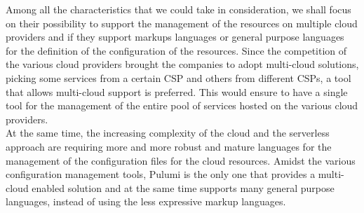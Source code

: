 Among all the characteristics that we could take in consideration, we shall focus on their possibility to support the management of the resources on multiple cloud providers and if they support markups languages or general purpose languages for the definition of the configuration of the resources.
Since the competition of the various cloud providers brought the companies to adopt multi-cloud solutions, picking some services from a certain CSP and others from different CSPs, a tool that allows multi-cloud support is preferred.
This would ensure to have a single tool for the management of the entire pool of services hosted on the various cloud providers.\\
At the same time, the increasing complexity of the cloud and the serverless approach are requiring more and more robust and mature languages for the management of the configuration files for the cloud resources.
Amidst the various configuration management tools, Pulumi is the only one that provides a multi-cloud enabled solution and at the same time supports many general purpose languages, instead of using the less expressive markup languages.\\

